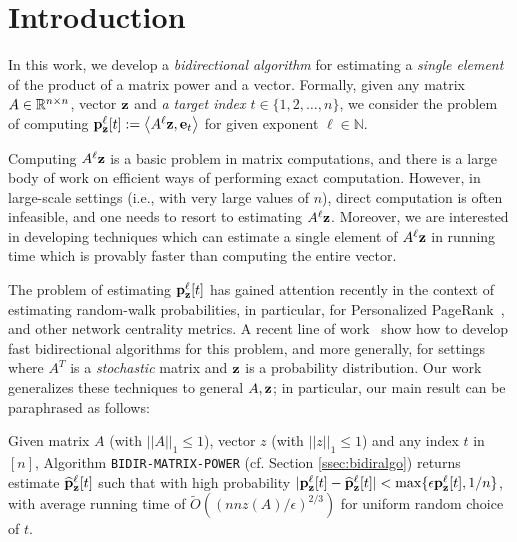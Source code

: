 \section{Introduction}
\label{sec:intro}

In this work, we develop a \emph{bidirectional algorithm} for estimating a \emph{single element} of the product of a matrix power and a vector.
Formally, given any matrix $A\in\mathbb{R}^{n\times n}$, vector $\mathbf{z}$ and \emph{a target index $t\in\{1,2,\ldots,n\}$}, we consider the problem of computing ${\mathbf{p}}_\mathbf{z}^{\ell}[t] := \left< A^{\ell}\mathbf{z}, \mathbf{e}_t \right>$ for given exponent $\ell\in\mathbb{N}$.

Computing $A^{\ell}\mathbf{z}$ is a basic problem in matrix computations, and there is a large body of work on efficient ways of performing exact computation. 
However, in large-scale settings (i.e., with very large values of $n$), direct computation is often infeasible, and one needs to resort to estimating $A^{\ell}\mathbf{z}$.
Moreover, we are interested in developing techniques which can estimate a single element of $A^{\ell}\mathbf{z}$ in running time which is provably faster than computing the entire vector. 

The problem of estimating ${\mathbf{p}}_\mathbf{z}^{\ell}[t]$ has gained attention recently in the context of estimating random-walk probabilities, in particular, for Personalized PageRank~\cite{Page1999}, and other network centrality metrics. 
A recent line of work~\cite{Lofgren2014,lofgren2016personalized,banerjee2015fast} show how to develop fast bidirectional algorithms for this problem, and more generally, for settings where $A^T$ is a \emph{stochastic} matrix and $\mathbf{z}$ is a probability distribution.
Our work generalizes these techniques to general $A,\mathbf{z}$; in particular, our main result can be paraphrased as follows:
\begin{proposition}
Given matrix $A$ (with $||A||_1\leq 1$), vector $z$ (with $||z||_1\leq 1$) and any index $t$ in $[n]$, Algorithm \texttt{BIDIR-MATRIX-POWER} (cf. Section \ref{ssec:bidiralgo}) returns estimate $\widehat{\mathbf{p}}_\mathbf{z}^{\ell}[t]$ such that with high probability $|{\mathbf{p}}_\mathbf{z}^{\ell}[t]-\widehat{\mathbf{p}}_\mathbf{z}^{\ell}[t]|<\max\{\epsilon{\mathbf{p}}_\mathbf{z}^{\ell}[t],1/n\}$, with average running time of $\widetilde{O}\left(\left(nnz(A)/\epsilon\right)^{2/3}\right)$ for uniform random choice of $t$.
\end{proposition}	

